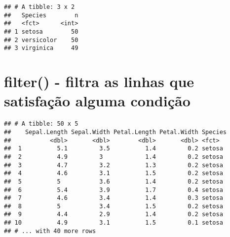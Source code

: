 \documentclass[]{book}
\newenvironment{Shaded}{\begin{snugshade}}{\end{snugshade}}
\newcommand{\KeywordTok}[1]{\textcolor[rgb]{0.13,0.29,0.53}{\textbf{#1}}}
\newcommand{\NormalTok}[1]{#1}
\newcommand{\OperatorTok}[1]{\textcolor[rgb]{0.81,0.36,0.00}{\textbf{#1}}}
\newcommand{\StringTok}[1]{\textcolor[rgb]{0.31,0.60,0.02}{#1}}
\begin{document}
\begin{Shaded}
\end{Shaded}

\begin{verbatim}
## # A tibble: 3 x 2
##   Species        n
##   <fct>      <int>
## 1 setosa        50
## 2 versicolor    50
## 3 virginica     49
\end{verbatim}

\hypertarget{filter---filtra-as-linhas-que-satisfauxe7uxe3o-alguma-condiuxe7uxe3o}{%
\section{filter() - filtra as linhas que satisfação alguma condição}\label{filter---filtra-as-linhas-que-satisfauxe7uxe3o-alguma-condiuxe7uxe3o}}

\begin{Shaded}
\end{Shaded}

\begin{verbatim}
## # A tibble: 50 x 5
##    Sepal.Length Sepal.Width Petal.Length Petal.Width Species
##           <dbl>       <dbl>        <dbl>       <dbl> <fct>  
##  1          5.1         3.5          1.4         0.2 setosa 
##  2          4.9         3            1.4         0.2 setosa 
##  3          4.7         3.2          1.3         0.2 setosa 
##  4          4.6         3.1          1.5         0.2 setosa 
##  5          5           3.6          1.4         0.2 setosa 
##  6          5.4         3.9          1.7         0.4 setosa 
##  7          4.6         3.4          1.4         0.3 setosa 
##  8          5           3.4          1.5         0.2 setosa 
##  9          4.4         2.9          1.4         0.2 setosa 
## 10          4.9         3.1          1.5         0.1 setosa 
## # ... with 40 more rows
\end{verbatim}

\begin{Shaded}
\end{Shaded}
\end{document}
